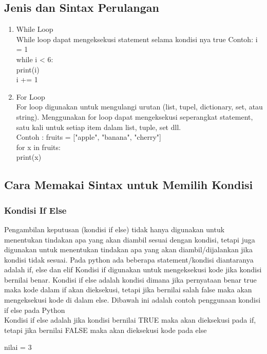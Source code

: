 \subsection{Jenis dan Sintax Perulangan}
\begin{enumerate}
\item
While Loop\\
While loop dapat mengeksekusi statement selama kondisi nya true
Contoh:
i = 1   \\
while i < 6: \\
  print(i)\\
  i += 1
\item
For Loop\\
For loop digunakan untuk mengulangi urutan (list, tupel, dictionary, set, atau string). Menggunakan for loop dapat mengeksekusi seperangkat statement, satu kali untuk setiap item dalam list, tuple, set dll.\\
Contoh :
fruits = ["apple", "banana", "cherry"]\\
for x in fruits:\\
  print(x)\\

\end{enumerate}
\subsection{Cara Memakai Sintax untuk Memilih Kondisi}
\subsubsection{Kondisi If Else}
	Pengambilan keputusan (kondisi if else) tidak hanya digunakan untuk menentukan tindakan apa yang akan diambil sesuai dengan kondisi, tetapi juga digunakan untuk menentukan tindakan apa yang akan diambil/dijalankan jika kondisi tidak sesuai.
Pada python ada beberapa statement/kondisi diantaranya adalah if, else dan elif Kondisi if digunakan untuk mengeksekusi kode jika kondisi bernilai benar.
Kondisi if else adalah kondisi dimana jika pernyataan benar true maka kode dalam if akan dieksekusi, tetapi jika bernilai salah false maka akan mengeksekusi kode di dalam else.
Dibawah ini adalah contoh penggunaan kondisi if else pada Python\\
Kondisi if else adalah jika kondisi bernilai TRUE maka akan dieksekusi pada if, tetapi jika bernilai FALSE maka akan dieksekusi kode pada else

nilai = 3\\

